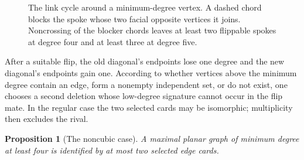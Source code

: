 \documentclass[11pt]{article}
\newtheorem{proposition}[theorem]{Proposition}
\theoremstyle{definition}
\theoremstyle{remark}
\begin{document}
\begin{figure}[htbp]
\centering
{}
\caption{The link cycle around a minimum-degree vertex.  A dashed chord
blocks the spoke whose two facial opposite vertices it joins.  Noncrossing
of the blocker chords leaves at least two flippable spokes at degree four and
at least three at degree five.}
\label{fig:blockers}
\end{figure}

After a suitable flip, the old diagonal's endpoints lose one degree and the
new diagonal's endpoints gain one.  According to whether vertices above the
minimum degree contain an edge, form a nonempty independent set, or do not
exist, one chooses a second deletion whose low-degree signature cannot occur
in the flip mate.  In the regular case the two selected cards may be
isomorphic; multiplicity then excludes the rival.

\begin{proposition}[The noncubic case]\label{prop:high-degree}
A maximal planar graph of minimum degree at least four is identified by at
most two selected edge cards.
\end{proposition}
\end{document}
